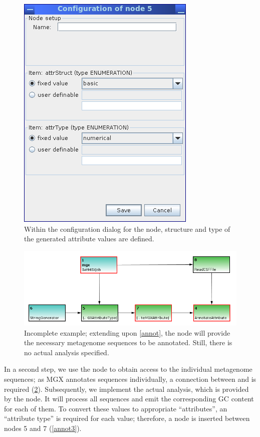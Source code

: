 \begin{figure}[H]
\centering
\includegraphics[width=.5\textwidth]{img/conveyor/createattrtype}
\caption[Defining an attribute type.]{Within the configuration dialog for the  node, structure and type of the generated attribute values are defined.}
\label{createattrtype}
\end{figure}

\begin{figure}[H]
\centering
\includegraphics[width=.8\textwidth]{img/conveyor/annotate_templ2}
\caption[Metagenome annotation]{Incomplete example; extending upon \ref{annot}, the  node will
provide the necessary metagenome sequences to be annotated. Still, there is no actual analysis specified.}
\label{annot2}
\end{figure}

In a second step, we use the  node to obtain access to the individual metagenome sequences; as 
MGX annotates sequences individually, a connection between  and  is
required (\ref{annot2}). Subsequently, we implement the actual analysis, which is provided by the 
node. It will process all sequences and emit the corresponding GC content for each of them. To convert these values to
appropriate ``attributes'', an ``attribute type'' is required for each value; therefore, a 
node is inserted between nodes 5 and 7 (\ref{annot3}).

